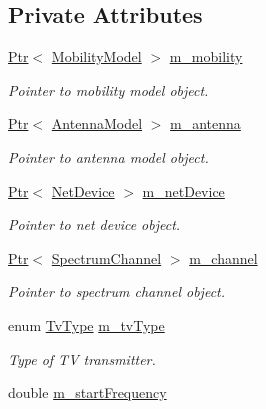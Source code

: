 \subsection*{Private Attributes}
\begin{DoxyCompactItemize}
\item 
\hyperlink{classns3_1_1Ptr}{Ptr}$<$ \hyperlink{classns3_1_1MobilityModel}{Mobility\+Model} $>$ \hyperlink{classns3_1_1TvSpectrumTransmitter_af43f03a30cf9a63b2af888334a4856b6}{m\+\_\+mobility}
\begin{DoxyCompactList}\small\item\em Pointer to mobility model object. \end{DoxyCompactList}\item 
\hyperlink{classns3_1_1Ptr}{Ptr}$<$ \hyperlink{classns3_1_1AntennaModel}{Antenna\+Model} $>$ \hyperlink{classns3_1_1TvSpectrumTransmitter_a1503f457fc9047fa63f0990cdb3fe8b6}{m\+\_\+antenna}
\begin{DoxyCompactList}\small\item\em Pointer to antenna model object. \end{DoxyCompactList}\item 
\hyperlink{classns3_1_1Ptr}{Ptr}$<$ \hyperlink{classns3_1_1NetDevice}{Net\+Device} $>$ \hyperlink{classns3_1_1TvSpectrumTransmitter_a48c928bdb3e53299d6e1cd35c2d2f7f5}{m\+\_\+net\+Device}
\begin{DoxyCompactList}\small\item\em Pointer to net device object. \end{DoxyCompactList}\item 
\hyperlink{classns3_1_1Ptr}{Ptr}$<$ \hyperlink{classns3_1_1SpectrumChannel}{Spectrum\+Channel} $>$ \hyperlink{classns3_1_1TvSpectrumTransmitter_ac432cb6c1d80ec4ce00b5ce3589ef1d5}{m\+\_\+channel}
\begin{DoxyCompactList}\small\item\em Pointer to spectrum channel object. \end{DoxyCompactList}\item 
enum \hyperlink{classns3_1_1TvSpectrumTransmitter_a9ec4fd6860d2d287b1304397b425f0d8}{Tv\+Type} \hyperlink{classns3_1_1TvSpectrumTransmitter_a78373632fd774cf3c26675dc0379ca13}{m\+\_\+tv\+Type}
\begin{DoxyCompactList}\small\item\em Type of TV transmitter. \end{DoxyCompactList}\item 
double \hyperlink{classns3_1_1TvSpectrumTransmitter_a776e1f1e5c91d1d4a457e26b0fc29375}{m\+\_\+start\+Frequency}

\end{DoxyCompactItemize}
